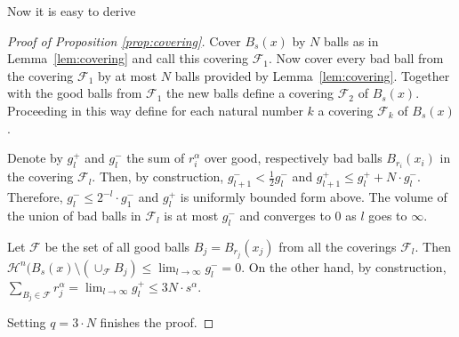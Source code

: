 \documentclass[12pt,leqno,intlimits]{amsart}
\numberwithin{equation}{section}
\theoremstyle{definition}
\theoremstyle{remark}
\newcommand{\lref}[1]{Lemma~\ref{#1}}
\begin{document}
Now it is easy to derive
\begin{proof}[Proof of Proposition \ref{prop:covering}]
Cover $B_{s} (x)$ by $N$ balls as in \lref{lem:covering}  and call this covering $\mathcal F_1$.  Now cover every bad
 ball from the covering $\mathcal F_1$ by at most $N$ balls provided by  \lref{lem:covering}. Together with the good balls from $\mathcal F_1$ the new balls define a covering $\mathcal F_2$ of $B_s (x)$. Proceeding in this way define for each natural number $k$ a covering $\mathcal F_k$ of $B_s(x)$.

 Denote by $g_l^{+}$ and $g_l ^-$ the sum of $r_i ^{\alpha}$ over good, respectively bad balls $B_{r_i} (x_i)$ in the covering $\mathcal F_l$.
 Then, by construction, $g_{l+1} ^- < \frac 1 2 g_l ^-$ and $g_{l+1} ^+ \leq g_l ^+ + N\cdot g_l ^-$. Therefore, $g_l^- \leq  2^{-l} \cdot  g_1 ^-$
 and $g_l^+$ is uniformly bounded form above.
 The volume of the union of bad balls in $\mathcal F_l$ is at most $g_l^-$ and converges to $0$ as $l$ goes to $\infty$.

 Let  $\mathcal F$ be the set of all good balls $B_j =B_{r_j} (x_j)$ from all the  coverings $\mathcal F_l$.
   Then $\mathcal H^n (B_s (x) \setminus (\cup _{\mathcal F} B_j  )   \leq  \lim _{l\to \infty} g_l ^- =0$.  On the other hand,
   by construction, $\sum _{B_j\in \mathcal F} r_j^{\alpha} = \lim _{l\to \infty} g_l^+  \leq  3N \cdot s^{\alpha}$.
	
		Setting $q=3\cdot N$ finishes the proof.
\end{proof}
\end{document}

